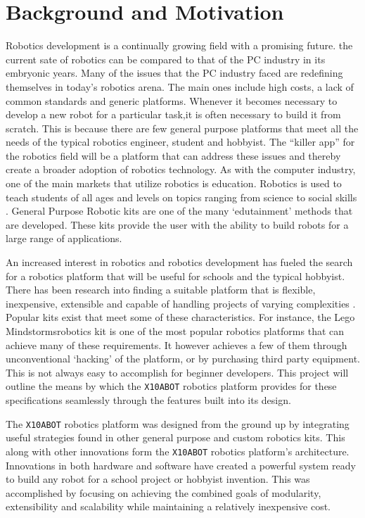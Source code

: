 \chapter{Background and Motivation} %
\label{cha:background_and_motivation}
\lipsum[1]\parencite{modcom}

Robotics development is a continually growing field with a promising future. the
current sate of robotics can be compared to that of the PC industry in its
embryonic years.\parencite{billgates} Many \parencite{billgates} of the issues that the PC industry faced are redefining
themselves in today's robotics arena. The main ones include high costs, a lack
of common standards and generic platforms. Whenever it becomes necessary to
develop a new robot for a particular task,it is often necessary to build
it from scratch. This is because there are few general purpose platforms that meet
all the needs of the typical robotics engineer, student and hobbyist\parencite{citation3}. The
``killer app'' for the robotics field will be a platform that can address these issues
and thereby create a broader adoption of robotics technology. As with the
computer industry, one of the main markets that utilize robotics is education.
Robotics is used to teach students of all ages and levels on topics ranging from
science to social skills \parencite{citation11}. General Purpose Robotic kits are one of the many
`edutainment' methods that are developed. These kits provide the user with the
ability to build robots for a large range of applications.

An increased interest in robotics and robotics development has fueled 
the search for a robotics platform that will be useful for schools and the 
typical hobbyist. There has been research into finding a suitable
platform that is flexible, inexpensive, extensible and capable of handling
projects of varying complexities \parencite{suitable, bot-mate}. Popular kits exist that meet some of
these characteristics. For instance, the Lego Mindstorms\texttrademark  robotics
kit is one of the most popular robotics platforms that can achieve many of these
requirements. It however achieves a few of them through unconventional
`hacking' of the platform, or by purchasing third party equipment. This is not
always easy to accomplish for beginner developers. This project will outline
the means by which the \texttt{X10ABOT} robotics platform provides for these
specifications seamlessly through the features built into its design.

The \texttt{X10ABOT} robotics platform  was designed from the ground up by integrating useful strategies
found in other general purpose and custom robotics kits. This along
with other innovations form the \texttt{X10ABOT} robotics platform's
architecture. Innovations in both hardware and software have created a powerful 
system ready to build any robot for a school project or hobbyist invention.
This was accomplished by focusing on achieving the combined goals of modularity, 
extensibility and scalability while maintaining a relatively inexpensive cost.


